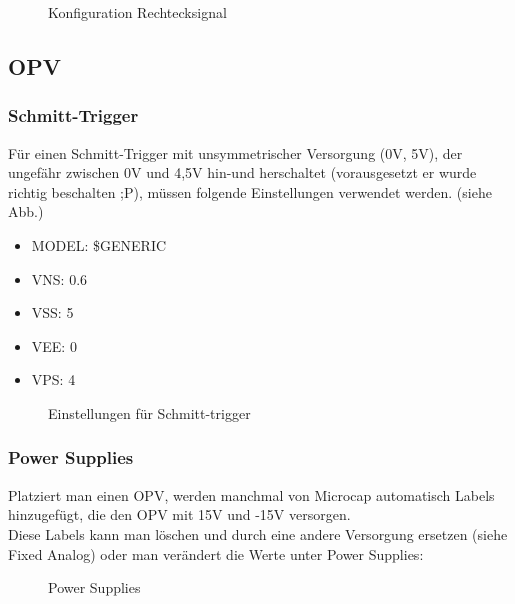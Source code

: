 \begin{figure}[h]
    \centering
    \caption{Konfiguration Rechtecksignal}
    \label{fig:Konfiguration Rechtecksignal}
\end{figure}

\newpage

\subsection*{OPV}

\subsubsection*{Schmitt-Trigger}
Für einen Schmitt-Trigger mit unsymmetrischer Versorgung (0V, 5V), der ungefähr zwischen 0V und 4,5V hin-und herschaltet (vorausgesetzt er wurde richtig beschalten ;P), müssen folgende Einstellungen verwendet werden. (siehe Abb.)

\begin{itemize}
    \item MODEL: \$GENERIC
    \item VNS: 0.6
    \item VSS: 5
    \item VEE: 0
    \item VPS: 4
\end{itemize}

\begin{figure}[h]
    \centering
    \caption{Einstellungen für Schmitt-trigger}
    \label{fig:Einstellungen für Schmitt-trigger}
\end{figure}

\subsubsection*{Power Supplies}
Platziert man einen OPV, werden manchmal von Microcap automatisch Labels hinzugefügt, die den OPV mit 15V und -15V versorgen.\\
Diese Labels kann man löschen und durch eine andere Versorgung ersetzen (siehe Fixed Analog) oder man verändert die Werte unter Power Supplies:

\begin{figure}[h]
    \centering
    \caption{Power Supplies}
    \label{fig:Power Supplies}
\end{figure}

